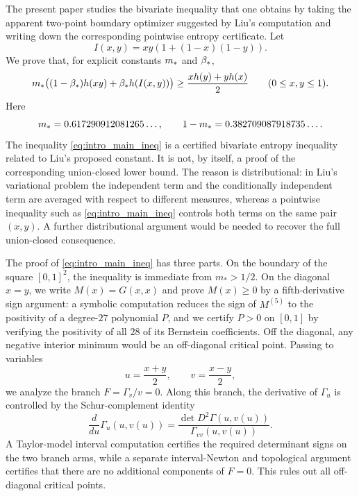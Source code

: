 The present paper studies the bivariate inequality that one obtains by taking
the apparent two-point boundary optimizer suggested by Liu's computation and
writing down the corresponding pointwise entropy certificate.  Let
\begin{equation}
  I(x,y)=xy(1+(1-x)(1-y)).
\end{equation}
We prove that, for explicit constants \(m_*\) and \(\beta_*\),
\begin{equation}\label{eq:intro_main_ineq}
  m_*\bigl((1-\beta_*)h(xy)+\beta_* h(I(x,y))\bigr)
  \ge
  \frac{x h(y)+y h(x)}2
  \qquad (0\le x,y\le1).
\end{equation}
Here
\begin{equation}
  m_*=0.617290912081265\ldots,
  \qquad
  1-m_*=0.382709087918735\ldots .
\end{equation}
The inequality \eqref{eq:intro_main_ineq} is a certified bivariate entropy
inequality related to Liu's proposed constant.  It is not, by itself, a proof
of the corresponding union-closed lower bound.  The reason is distributional:
in Liu's variational problem the independent term and the conditionally
independent term are averaged with respect to different measures, whereas a
pointwise inequality such as \eqref{eq:intro_main_ineq} controls both terms on
the same pair \((x,y)\).  A further distributional argument would be needed to
recover the full union-closed consequence.

The proof of \eqref{eq:intro_main_ineq} has three parts.  On the boundary of
the square \([0,1]^2\), the inequality is immediate from \(m_*>1/2\).  On the
diagonal \(x=y\), we write \(M(x)=G(x,x)\) and prove \(M(x)\ge0\) by a
fifth-derivative sign argument: a symbolic computation reduces the sign of
\(M^{(5)}\) to the positivity of a degree-\(27\) polynomial \(P\), and we
certify \(P>0\) on \([0,1]\) by verifying the positivity of all \(28\) of its
Bernstein coefficients.  Off the diagonal, any negative interior minimum would
be an off-diagonal critical point.  Passing to variables
\[
  u=\frac{x+y}{2},
  \qquad
  v=\frac{x-y}{2},
\]
we analyze the branch \(F=\Gamma_v/v=0\).  Along this branch, the derivative of
\(\Gamma_u\) is controlled by the Schur-complement identity
\[
  \frac{d}{du}\Gamma_u(u,v(u))
  =
  \frac{\det D^2\Gamma(u,v(u))}{\Gamma_{vv}(u,v(u))}.
\]
A Taylor-model interval computation certifies the required determinant signs
on the two branch arms, while a separate interval-Newton and topological
argument certifies that there are no additional components of \(F=0\).  This
rules out all off-diagonal critical points.

